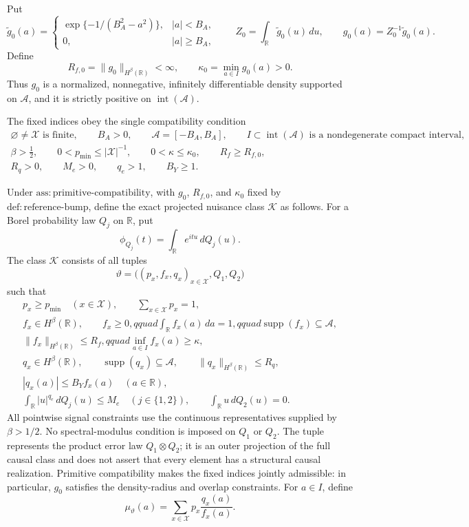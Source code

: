 Put
\[
 \widetilde g_0(a)=
 \begin{cases}
  \exp\{-1/(B_A^2-a^2)\},& |a|<B_A,\\
  0,& |a|\ge B_A,
 \end{cases}
 \qquad
 Z_0=\int_{\mathbb R}\widetilde g_0(u)\,du,
 \qquad
 g_0(a)=Z_0^{-1}\widetilde g_0(a).
\]
Define
\[
 R_{f,0}=\|g_0\|_{H^\beta(\mathbb R)}<\infty,
 \qquad
 \kappa_0=\min_{a\in I}g_0(a)>0.
\]
Thus \(g_0\) is a normalized, nonnegative, infinitely differentiable density supported on \(\mathcal A\), and it is strictly positive on \(\operatorname{int}(\mathcal A)\).

The fixed indices obey the single compatibility condition
\[
 \begin{gathered}
 \varnothing\ne\mathcal X\text{ is finite},\qquad
 B_A>0,\qquad
 \mathcal A=[-B_A,B_A],\qquad
 I\subset\operatorname{int}(\mathcal A)
 \text{ is a nondegenerate compact interval},\\
 \beta>\frac12,\qquad
 0<p_{\min}\le |\mathcal X|^{-1},\qquad
 0<\kappa\le\kappa_0,\qquad
 R_f\ge R_{f,0},\\
 R_q>0,\qquad M_e>0,\qquad q_e>1,\qquad B_Y\ge1.
 \end{gathered}
\]

Under \(\mathrm{ass{:}primitive\text{-}compatibility}\), with \(g_0\), \(R_{f,0}\), and \(\kappa_0\) fixed by \(\mathrm{def{:}reference\text{-}bump}\), define the exact projected nuisance class \(\mathscr K\) as follows.  For a Borel probability law \(Q_j\) on \(\mathbb R\), put
\[
 \phi_{Q_j}(t)=\int_{\mathbb R}e^{itu}\,dQ_j(u).
\]
The class \(\mathscr K\) consists of all tuples
\[
 \vartheta=\bigl((p_x,f_x,q_x)_{x\in\mathcal X},Q_1,Q_2\bigr)
\]
such that
\[
 \begin{gathered}
 p_x\ge p_{\min}\quad(x\in\mathcal X),
 \qquad \sum_{x\in\mathcal X}p_x=1,\\
 f_x\in H^\beta(\mathbb R),\qquad f_x\ge0,qquad
 \int_{\mathbb R}f_x(a)\,da=1,qquad
 \operatorname{supp}(f_x)\subseteq\mathcal A,\\
 \|f_x\|_{H^\beta(\mathbb R)}\le R_f,qquad
 \inf_{a\in I}f_x(a)\ge\kappa,\\
 q_x\in H^\beta(\mathbb R),
 \qquad \operatorname{supp}(q_x)\subseteq\mathcal A,
 \qquad \|q_x\|_{H^\beta(\mathbb R)}\le R_q,\\
 |q_x(a)|\le B_Yf_x(a)\quad(a\in\mathbb R),\\
 \int_{\mathbb R}|u|^{q_e}\,dQ_j(u)\le M_e
 \quad(j\in\{1,2\}),
 \qquad \int_{\mathbb R}u\,dQ_2(u)=0.
 \end{gathered}
\]
All pointwise signal constraints use the continuous representatives supplied by \(\beta>1/2\).  No spectral-modulus condition is imposed on \(Q_1\) or \(Q_2\).  The tuple represents the product error law \(Q_1\otimes Q_2\); it is an outer projection of the full causal class and does not assert that every element has a structural causal realization.  Primitive compatibility makes the fixed indices jointly admissible: in particular, \(g_0\) satisfies the density-radius and overlap constraints.  For \(a\in I\), define
\[
 \mu_\vartheta(a)=\sum_{x\in\mathcal X}p_x\frac{q_x(a)}{f_x(a)}.
\]

